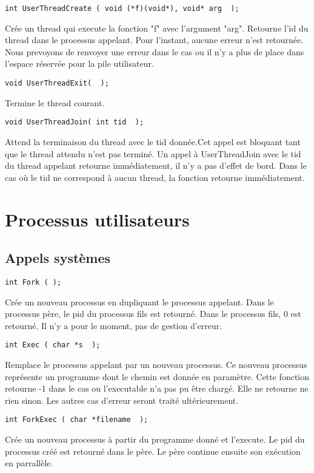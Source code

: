 \documentclass{report}
\begin{document}
\begin{verbatim}
int UserThreadCreate ( void (*f)(void*), void* arg  );
\end{verbatim}
Crée un thread qui execute la fonction "f" avec l'argument "arg". Retourne l'id du thread dans le processus appelant. Pour l'instant, aucune erreur n'est retournée. Nous prevoyons de renvoyer une erreur dans le cas ou il n'y a plus de place dans l'espace réservée pour la pile utilisateur.

\begin{verbatim}
void UserThreadExit(  );
\end{verbatim}
Termine le thread courant.

\begin{verbatim}
void UserThreadJoin( int tid  );
\end{verbatim}
Attend la terminaison du thread avec le tid donnée.Cet appel est bloquant tant que le thread attendu n'est pas terminé.  Un appel à UserThreadJoin avec le tid du thread appelant retourne immédiatement, il n'y a pas d'effet de bord. Dans le cas où le tid ne correspond à aucun thread, la fonction retourne immédiatement. 

\section{Processus utilisateurs}
\subsection{Appels systèmes}

\begin{verbatim}
int Fork ( );
\end{verbatim}
Crée un nouveau processus en dupliquant le processus appelant. Dans le processus père, le pid du processus fils est retourné. Dans le processus fils, 0 est retourné. 
Il n'y a pour le moment, pas de gestion d'erreur.

\begin{verbatim}
int Exec ( char *s  );
\end{verbatim}
Remplace le processus appelant par un nouveau processus. Ce nouveau processus représente un programme dont le chemin est donnée en paramètre.
Cette fonction retourne -1 dans le cas ou l'executable n'a pas pu être chargé. Elle ne retourne ne rien sinon. Les autres cas d'erreur seront traité ultérieurement. 

\begin{verbatim}
int ForkExec ( char *filename  );
\end{verbatim}
Crée un nouveau processus à partir du programme donné et l'execute. Le pid du processus créé est retourné dans le père.
Le père continue ensuite son exécution en parrallèle.
\end{document}
